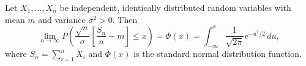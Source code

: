 Let $X_1, \ldots, X_n$ be independent, identically distributed random variables with mean $m$ and variance $\sigma^2 > 0$. Then
$$\lim_{n \to \infty} P\left(\frac{\sqrt{n}}{\sigma}\left[\frac{S_n}{n} - m\right] \leq x\right) = \Phi(x) = \int_{-\infty}^{x} \frac{1}{\sqrt{2\pi}} e^{-u^2/2} \, du,$$
where $S_n = \sum_{i=1}^{n} X_i$ and $\Phi(x)$ is the standard normal distribution function.
